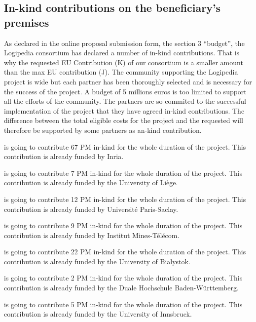\subsection*{In-kind contributions on the beneficiary’s premises}

As declared in the online proposal submission form, the section 3
``budget'', the Logipedia consortium has declared a number of in-kind
contributions. That is why the requested EU Contribution (K) of our
consortium is a smaller amount than the max EU contribution (J). The
community supporting the Logipedia project is wide but each partner
has been thoroughly selected and is necessary for the success of the
project.
A budget of 5 millions euros is too limited to support all
the efforts of the community.
The partners are so commited to the successful implementation of the
project that they have agreed in-kind contributions.
The difference between the total
eligible costs for the project and the requested will therefore be
supported by some partners as an-kind contribution.

 is going to contribute
67 PM in-kind for the whole duration of the project.
This contribution is already funded by Inria.


 is going to contribute 7 PM in-kind for the whole duration of the project.
This contribution is already funded by the University of Liège.

 is going to contribute 12 PM in-kind for the whole duration of the project.
This contribution is already funded by Université Paris-Saclay.

 is going to contribute 9 PM in-kind for the whole duration of the project.
This contribution is already funded by Institut Mines-Télécom.

 is going to contribute 22 PM in-kind for the whole duration of the project.
This contribution is already funded by the University of Bialystok.

 is going to contribute 2 PM in-kind for the whole duration of the project.
This contribution is already funded by the Duale Hochschule Baden-Württemberg.

 is going to contribute 5 PM in-kind for the whole duration of the project.
This contribution is already funded by the University of Innsbruck.

